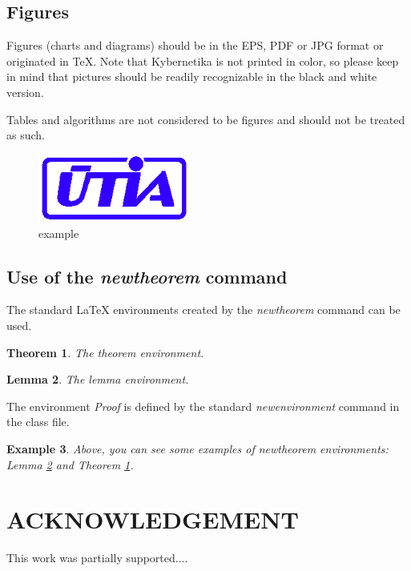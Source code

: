 \documentclass{kybernetika}
\newtheorem{theorem}{Theorem}[section]
\newtheorem{lemma}[theorem]{Lemma}
\newtheorem{example}[theorem]{Example}
\begin{document}
\subsection{Figures}
Figures (charts and diagrams) should be in the EPS, PDF or JPG format or originated in TeX. Note that Kybernetika is not printed in color, so please keep in mind that pictures should be readily recognizable in the black and white version.

Tables and algorithms are not considered to be figures and should not be treated as such.

\begin{figure}[h]
\centering
\includegraphics[width=5cm]{utia}
\caption{example}
\end{figure}

\subsection{Use of the \texorpdfstring{{\it newtheorem}}{newtheorem} command}
The standard {\LaTeX} environments created by the {\it newtheorem} command can be
used.

\begin{theorem}\label{main_thm}
The theorem environment.
\end{theorem}
\begin{lemma}\label{my_lemma}
The lemma environment.
\end{lemma}
\begin{Proof}
The environment {\it Proof} is defined by the standard {\it newenvironment}
command in the class file.
\end{Proof}
\begin{example}
Above, you can see some examples of {\it newtheorem} environments: Lemma \ref{my_lemma} and Theorem \ref{main_thm}.
\end{example}


\section*{ACKNOWLEDGEMENT}
\small
This work was partially supported....

\makesubmdate
\end{document}
